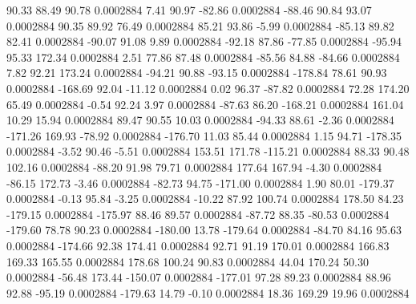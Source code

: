        90.33       88.49       90.78     0.0002884
        7.41       90.97      -82.86     0.0002884
      -88.46       90.84       93.07     0.0002884
       90.35       89.92       76.49     0.0002884
       85.21       93.86       -5.99     0.0002884
      -85.13       89.82       82.41     0.0002884
      -90.07       91.08        9.89     0.0002884
      -92.18       87.86      -77.85     0.0002884
      -95.94       95.33      172.34     0.0002884
        2.51       77.86       87.48     0.0002884
      -85.56       84.88      -84.66     0.0002884
        7.82       92.21      173.24     0.0002884
      -94.21       90.88      -93.15     0.0002884
     -178.84       78.61       90.93     0.0002884
     -168.69       92.04      -11.12     0.0002884
        0.02       96.37      -87.82     0.0002884
       72.28      174.20       65.49     0.0002884
       -0.54       92.24        3.97     0.0002884
      -87.63       86.20     -168.21     0.0002884
      161.04       10.29       15.94     0.0002884
       89.47       90.55       10.03     0.0002884
      -94.33       88.61       -2.36     0.0002884
     -171.26      169.93      -78.92     0.0002884
     -176.70       11.03       85.44     0.0002884
        1.15       94.71     -178.35     0.0002884
       -3.52       90.46       -5.51     0.0002884
      153.51      171.78     -115.21     0.0002884
       88.33       90.48      102.16     0.0002884
      -88.20       91.98       79.71     0.0002884
      177.64      167.94       -4.30     0.0002884
      -86.15      172.73       -3.46     0.0002884
      -82.73       94.75     -171.00     0.0002884
        1.90       80.01     -179.37     0.0002884
       -0.13       95.84       -3.25     0.0002884
      -10.22       87.92      100.74     0.0002884
      178.50       84.23     -179.15     0.0002884
     -175.97       88.46       89.57     0.0002884
      -87.72       88.35      -80.53     0.0002884
     -179.60       78.78       90.23     0.0002884
     -180.00       13.78     -179.64     0.0002884
      -84.70       84.16       95.63     0.0002884
     -174.66       92.38      174.41     0.0002884
       92.71       91.19      170.01     0.0002884
      166.83      169.33      165.55     0.0002884
      178.68      100.24       90.83     0.0002884
       44.04      170.24       50.30     0.0002884
      -56.48      173.44     -150.07     0.0002884
     -177.01       97.28       89.23     0.0002884
       88.96       92.88      -95.19     0.0002884
     -179.63       14.79       -0.10     0.0002884
       18.36      169.29       19.96     0.0002884
